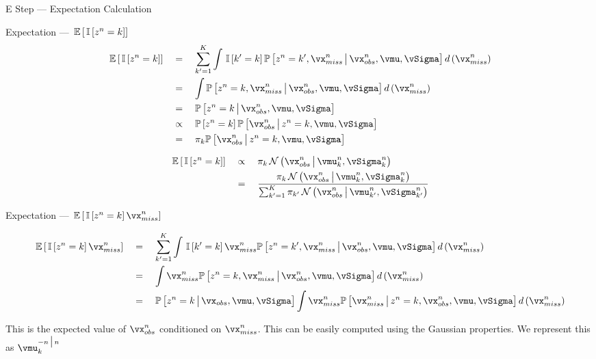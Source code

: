 \documentclass{article}
\begin{document}
\begin{question}
\begin{qsection}{E Step --- Expectation Calculation}
\begin{qsubsection}{Expectation --- $\E{\is{z^n = k}}$}
			\begin{align*}
				\E{\is{z^n = k}}	&\eq	\sum_{\pr{k} = 1}^{K} \int \is{\pr{k} = k} \prob{z^n = \pr{k}, \vx_{miss}^n \pipe \vx_{obs}^n, \vmu, \vSigma} d \para{\vx_{miss}^n} \\
									&\eq	\int \prob{z^n = k, \vx_{miss}^n \pipe \vx_{obs}^n, \vmu, \vSigma} d \para{\vx_{miss}^n} \\
									&\eq	\prob{z^n = k \pipe \vx_{obs}^n, \vmu, \vSigma} \\
									&\qprop	\prob{z^n = k} \prob{\vx_{obs}^n \pipe z^n = k, \vmu, \vSigma} \\
									&\eq	\pi_k \prob{\vx_{obs}^n \pipe z^n = k, \vmu, \vSigma}
			\end{align*}


			\begin{align*}
				\E{\is{z^n = k}}	&\qprop	\pi_k \ND{\vx_{obs}^n \pipe \vmu_k^n, \vSigma_k^n} \\
			&\eq	\frac{\pi_k \ND{\vx_{obs}^n \pipe \vmu_k^n, \vSigma_k^n}}{\sum_{\pr{k} = 1}^{K} \pi_{\pr{k}} \ND{\vx_{obs}^n \pipe \vmu_{\pr{k}}^n, \vSigma_{\pr{k}}^n}}
			\end{align*}

	
		\end{qsubsection}

		\begin{qsubsection}{Expectation --- $\E{\is{z^n = k} \vx_{miss}^n}$}

			\begin{align*}
				\E{\is{z^n = k} \vx_{miss}^n}	&\eq	\sum_{\pr{k} = 1}^{K} \int \is{\pr{k} = k} \vx_{miss}^n \prob{z^n = \pr{k}, \vx_{miss}^n \pipe \vx_{obs}^n, \vmu, \vSigma} d \para{\vx_{miss}^n} \\
												&\eq	\int \vx_{miss}^n \prob{z^n = k, \vx_{miss}^n \pipe \vx_{obs}^n, \vmu, \vSigma} d \para{\vx_{miss}^n} \\
												&\eq	\prob{z^n = k \pipe \vx_{obs}, \vmu, \vSigma} \int \vx_{miss}^n \prob{\vx_{miss}^n \pipe z^n = k, \vx_{obs}^n, \vmu, \vSigma} d \para{\vx_{miss}^n}
			\end{align*}

			This is the expected value of $\vx_{obs}^n$ conditioned on $\vx_{miss}^{n}$. This can be easily computed using the Gaussian properties. We represent this as $\vmu_k^{-n \pipe n}$


\end{qsubsection}
\end{qsection}
\end{question}
\end{document}

